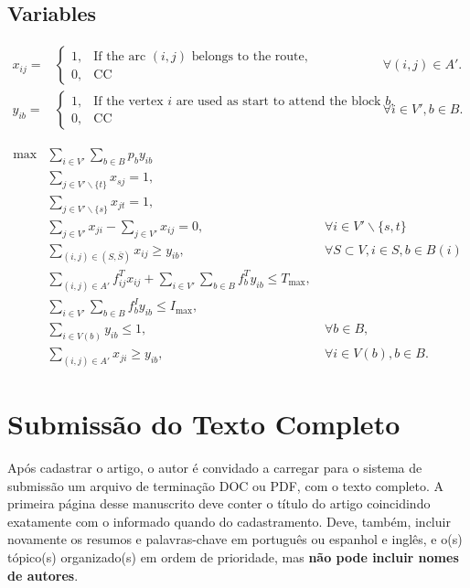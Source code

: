 \documentclass[a4paper,11pt]{article}
\begin{document}
\subsection{Variables}

\begin{align}
  \nonumber x_{ij} = & \begin{cases}
                         1, & \text{If the arc $(i, j)$ belongs to the route,} \\
                         0, & \text{CC} 
                       \end{cases} & \forall (i, j) \in A'. \\
  \nonumber y_{ib} = & \begin{cases}
                         1, & \text{If the vertex $i$ are used as start to attend the block $b$,} \\
                         0, & \text{CC} 
                       \end{cases} & \forall i \in V', b \in B.
\end{align}


\begin{align}
  \max & \sum_{i \in V'} \sum_{b \in B} p_b y_{ib} & \\
       & \sum_{j \in V'\backslash \{t\}} x_{sj} = 1, & \\
       & \sum_{j \in V'\backslash \{s\}} x_{jt} = 1, & \\
       & \sum_{j \in V'} x_{ji} - \sum_{j \in V'} x_{ij} = 0, & \ \forall i \in V' \backslash \{s, t\} \\
       & \sum_{(i, j) \in (S, \bar{S})} x_{ij} \geq y_{ib}, & \ \forall S \subset V, i \in S, b \in B(i) \\
       & \sum_{(i, j) \in A'} f^T_{ij} x_{ij} + \sum_{i \in V'} \sum_{b \in B} f^T_b y_{ib} \leq T_{\max}, & \\
       & \sum_{i \in V'} \sum_{b \in B} f^I_b y_{ib} \leq I_{\max}, & \\
       & \sum_{i \in V(b)} y_{ib} \leq 1, & \ \forall b \in B, \\
       & \sum_{(i, j) \in A'} x_{ji} \geq y_{ib}, & \ \forall i \in V(b), b \in B.
\end{align}



\section{Submiss\~ao do Texto Completo}

Ap\'os cadastrar o artigo, o autor \'e convidado a carregar para o sistema de submiss\~ao um arquivo 
de termina\-\c c\~ao DOC ou PDF, com o texto completo. 
A primeira p\'agina desse manuscrito deve conter o t\'itulo do artigo coincidindo exatamente com o informado quando do cadastramento. 
Deve, tamb\'em, incluir novamente os resumos e palavras-chave em portugu\^es ou espanhol e ingl\^es, e o(s) t\'opico(s) organizado(s) 
em ordem de prioridade, mas \textbf{n\~ao pode incluir nomes de autores}.
\end{document}
